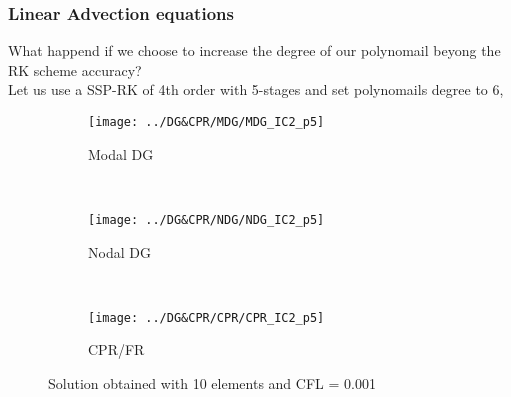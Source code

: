 \begin{frame} \frametitle{Linear Advection equations}
What happend if we choose to increase the degree of our polynomail beyong the RK scheme accuracy?\\
Let us use a SSP-RK of 4th order with 5-stages and set polynomails degree to 6,
	\begin{figure}
        \centering
        \begin{subfigure}[b]{0.31\textwidth}
                \centering
                \texttt{[image: ../DG\&CPR/MDG/MDG\_IC2\_p5]}
                \caption{Modal DG}
                \label{fig:MDG_IC2_p5}
        \end{subfigure}%
				~
        \begin{subfigure}[b]{0.31\textwidth}
                \centering
                \texttt{[image: ../DG\&CPR/NDG/NDG\_IC2\_p5]}
                \caption{Nodal DG}
                \label{fig:NDG_IC2_p5}
        \end{subfigure}
				~
        \begin{subfigure}[b]{0.31\textwidth}
								\centering
                \texttt{[image: ../DG\&CPR/CPR/CPR\_IC2\_p5]}
                \caption{CPR/FR}
                \label{fig:CPR_IC2_p5}
        \end{subfigure}
				\caption{Solution obtained with 10 elements and CFL = 0.001}
				\label{fig:compareLinearAdvection_p5}
	\end{figure}
\end{frame}

